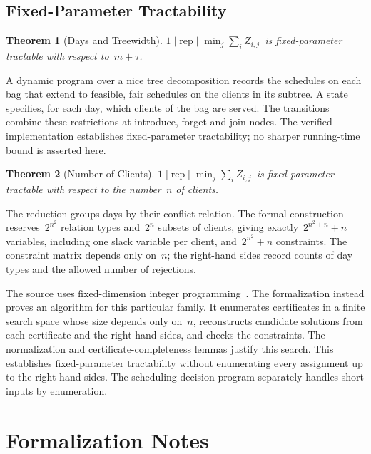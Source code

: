 \documentclass[11pt,a4paper]{article}
\newtheorem{theorem}{Theorem}
\theoremstyle{definition}
\newcommand{\threefield}[3]{$#1\mid#2\mid#3$}
\newcommand{\rep}{\mathrm{rep}}
\newcommand{\EQUIJIT}{\threefield{1}{\rep}{\min_j \sum_i Z_{i,j}}}
\begin{document}
\subsection{Fixed-Parameter Tractability}

\setcounter{theorem}{3}
\begin{theorem}[Days and Treewidth]
\label{thm:4b}
\EQUIJIT\ is fixed-parameter tractable with respect to~$m+\tau$.
\end{theorem}
A dynamic program over a nice tree decomposition records the schedules on each bag
that extend to feasible, fair schedules on the clients in its subtree. A state specifies,
for each day, which clients of the bag are served. The transitions combine these
restrictions at introduce, forget and join nodes. The verified implementation establishes
fixed-parameter tractability; no sharper running-time bound is asserted here.

\setcounter{theorem}{3}
\begin{theorem}[Number of Clients]
\label{thm:4c}
\EQUIJIT\ is fixed-parameter tractable with respect to the number~$n$ of clients.
\end{theorem}
The reduction groups days by their conflict relation. The formal construction reserves~$2^{n^2}$ relation types and~$2^n$ subsets of clients, giving exactly~$2^{n^2+n}+n$ variables, including one slack variable per client, and~$2^{n^2}+n$
constraints. The constraint matrix depends only on~$n$; the right-hand sides record
counts of day types and the allowed number of rejections.

The source uses fixed-dimension integer programming~\cite{Lenstra83}. The formalization
instead proves an algorithm for this particular family. It enumerates certificates in a
finite search space whose size depends only on~$n$, reconstructs candidate solutions
from each certificate and the right-hand sides, and checks the constraints. The
normalization and certificate-completeness lemmas justify this search. This establishes
fixed-parameter tractability without enumerating every assignment up to the right-hand
sides. The scheduling decision program separately handles short inputs by enumeration.

\section{Formalization Notes}
\end{document}
